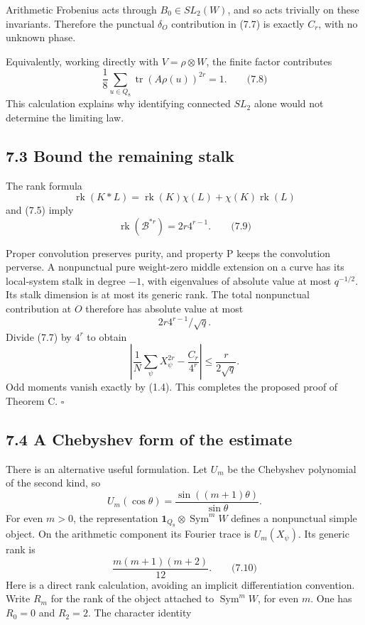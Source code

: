 \documentclass[
  11pt,
  a4paper,
]{article}
\begin{document}
Arithmetic Frobenius acts through \(B_0\in SL_2(W)\), and so acts
trivially on these invariants. Therefore the punctual \(\delta_O\)
contribution in (7.7) is exactly \(C_r\), with no unknown phase.

Equivalently, working directly with \(V=\rho\otimes W\), the finite
factor contributes \[
\frac18\sum_{u\in Q_8}\operatorname{tr}(A\rho(u))^{2r}=1.
\qquad \text{(7.8)}
\] This calculation explains why identifying connected \(SL_2\) alone
would not determine the limiting law.

\subsection{7.3 Bound the remaining
stalk}\label{bound-the-remaining-stalk}

The rank formula \[
\operatorname{rk}(K*L)
=\operatorname{rk}(K)\chi(L)+\chi(K)\operatorname{rk}(L)
\] and (7.5) imply \[
\operatorname{rk}(\mathcal B^{*r})=2r4^{r-1}.
\qquad \text{(7.9)}
\]

Proper convolution preserves purity, and property P keeps the
convolution perverse. A nonpunctual pure weight-zero middle extension on
a curve has its local-system stalk in degree \(-1\), with eigenvalues of
absolute value at most \(q^{-1/2}\). Its stalk dimension is at most its
generic rank. The total nonpunctual contribution at \(O\) therefore has
absolute value at most \[
2r4^{r-1}/\sqrt q.
\] Divide (7.7) by \(4^r\) to obtain \[
\left|\frac1N\sum_\psi X_\psi^{2r}-\frac{C_r}{4^r}\right|
\le\frac{r}{2\sqrt q}.
\] Odd moments vanish exactly by (1.4). This completes the proposed
proof of Theorem C. \(\square\)

\subsection{7.4 A Chebyshev form of the
estimate}\label{a-chebyshev-form-of-the-estimate}

There is an alternative useful formulation. Let \(U_m\) be the Chebyshev
polynomial of the second kind, so \[
U_m(\cos\theta)=\frac{\sin((m+1)\theta)}{\sin\theta}.
\] For even \(m>0\), the representation
\(\mathbf1_{Q_8}\otimes\operatorname{Sym}^mW\) defines a nonpunctual
simple object. On the arithmetic component its Fourier trace is
\(U_m(X_\psi)\). Its generic rank is \[
\frac{m(m+1)(m+2)}{12}.
\qquad \text{(7.10)}
\] Here is a direct rank calculation, avoiding an implicit
differentiation convention. Write \(R_m\) for the rank of the object
attached to \(\operatorname{Sym}^mW\), for even \(m\). One has \(R_0=0\)
and \(R_2=2\). The character identity
\end{document}
